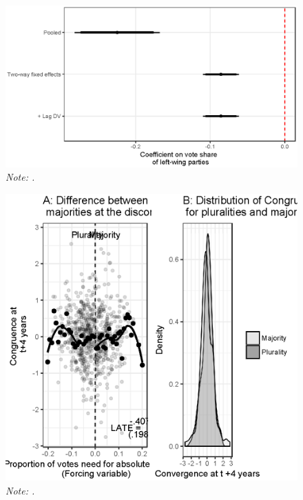 \documentclass[12pt,a4]{article}
\newcommand\fnote[1]{\captionsetup{font=small}\caption*{#1}}
\begin{document}
\begin{figure}[H]
	\includegraphics[scale = 1]{ggplot_coef.eps}
	\caption{\textbf{.}} \fnote{ \emph{Note: .}}
	\label{fig:bar}
\end{figure}	


\begin{figure}[H]
	\includegraphics[scale = .75]{rddCongruence.eps}
	\caption{\textbf{.}} \fnote{ \emph{Note: .}}
	\label{fig:bar}
\end{figure}
	
	
\end{document}
